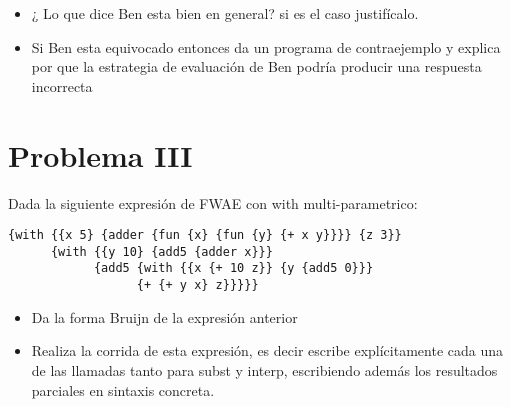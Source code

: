 \documentclass[a4paper]{article}
\begin{document}
\begin{itemize}
\item ¿ Lo que dice Ben esta bien en general? si es el caso justifícalo.
\item Si Ben esta equivocado entonces da un programa de contraejemplo y explica por que la estrategia de evaluación de Ben podría producir una respuesta incorrecta
\end{itemize}

\section{Problema III}
Dada la siguiente expresión de FWAE con with multi-parametrico:
\begin{verbatim}
{with {{x 5} {adder {fun {x} {fun {y} {+ x y}}}} {z 3}}
      {with {{y 10} {add5 {adder x}}}
            {add5 {with {{x {+ 10 z}} {y {add5 0}}}
                  {+ {+ y x} z}}}}}
\end{verbatim}
\begin{itemize}
\item Da la forma Bruijn de la expresión anterior
\item Realiza la corrida de esta expresión, es decir escribe explícitamente cada una de las llamadas tanto para subst y interp, escribiendo además los resultados parciales en sintaxis concreta.
\end{itemize}
\end{document}
